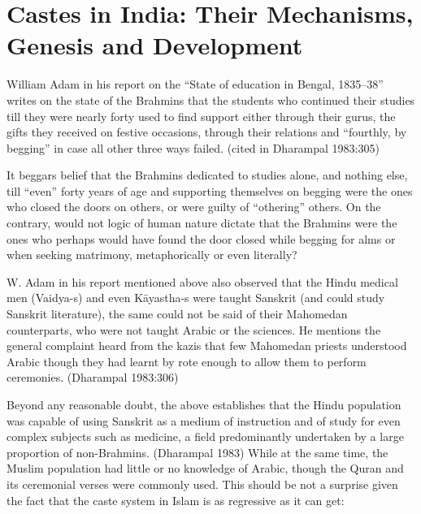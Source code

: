 
\section*{Castes in India: Their Mechanisms, Genesis and Development}

William Adam in his report on the “State of education in Bengal, 1835–38” writes on the state of the Brahmins that the students who continued their studies till they were nearly forty used to find support either through their gurus, the gifts they received on festive occasions, through their relations and “fourthly, by begging” in case all other three ways failed. (cited in Dharampal 1983:305)

It beggars belief that the Brahmins dedicated to studies alone, and nothing else, till “even” forty years of age and supporting themselves on begging were the ones who closed the doors on others, or were guilty of “othering” others. On the contrary, would not logic of human nature dictate that the Brahmins were the ones who perhaps would have found the door closed while begging for alms or when seeking matrimony, metaphorically or even literally?

W. Adam in his report mentioned above also observed that the Hindu medical men (Vaidya-s) and even Kāyastha-s were taught Sanskrit (and could study Sanskrit literature), the same could not be said of their Mahomedan counterparts, who were not taught Arabic or the sciences. He mentions the general complaint heard from the kazis that few Mahomedan priests understood Arabic though they had learnt by rote enough to allow them to perform ceremonies. (Dharampal 1983:306)

Beyond any reasonable doubt, the above establishes that the Hindu population was capable of using Sanskrit as a medium of instruction and of study for even complex subjects such as medicine, a field predominantly undertaken by a large proportion of non-Brahmins. (Dharampal 1983) While at the same time, the Muslim population had little or no knowledge of Arabic, though the Quran and its ceremonial verses were commonly used. This should be not a surprise given the fact that the caste system in Islam is as regressive as it can get:

\newpage


